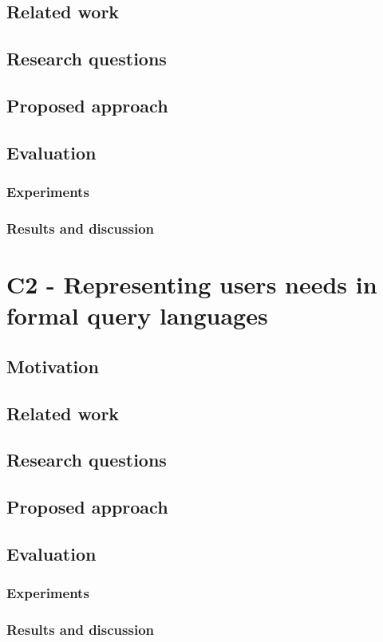 \documentclass{article}
\begin{document}
\subsection{Related work}
\subsection{Research questions}
\subsection{Proposed approach}
\subsection{Evaluation}
\subsubsection{Experiments}
\subsubsection{Results and discussion}


\section{C2 - Representing users needs in formal query languages}
\subsection{Motivation}
\subsection{Related work}
\subsection{Research questions}
\subsection{Proposed approach}
\subsection{Evaluation}
\subsubsection{Experiments}
\subsubsection{Results and discussion}
\end{document}
